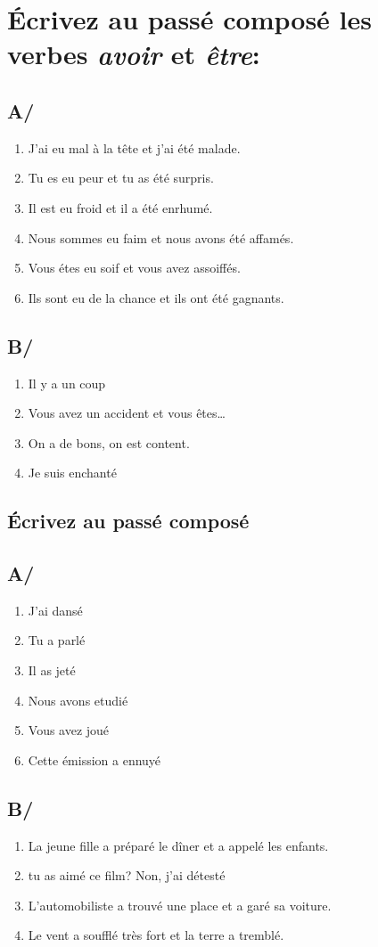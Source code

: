 \section{Écrivez au passé composé les verbes \emph{avoir} et \emph{être}:}
\subsection*{A/}

\begin{enumerate}
    \item J'ai eu mal à la tête et j'ai été malade.
    \item Tu es eu peur et tu as été surpris.
    \item Il est eu froid et il a été enrhumé.
    \item Nous sommes eu faim et nous avons été affamés.
    \item Vous étes eu soif et vous avez assoiffés.
    \item Ils sont eu de la chance et ils ont été gagnants. 
\end{enumerate}

\subsection*{B/}

\begin{enumerate}
    \item Il y a un coup
    \item Vous avez un accident et vous êtes\dots
    \item On a de bons, on est content.
    \item Je suis enchanté
\end{enumerate}

\subsection{Écrivez au passé composé}

\subsection{A/}

\begin{enumerate}
    \item J'ai dansé
    \item Tu a parlé
    \item Il as jeté
    \item Nous avons etudié
    \item Vous avez joué
    \item Cette émission a ennuyé
\end{enumerate}

\subsection{B/}

\begin{enumerate}
    \item La jeune fille a préparé le dîner et a appelé les enfants.
    \item tu as aimé ce film? Non, j'ai détesté 
    \item L'automobiliste a trouvé une place et a garé sa voiture.
    \item Le vent a soufflé très fort et la terre a tremblé. 
\end{enumerate}